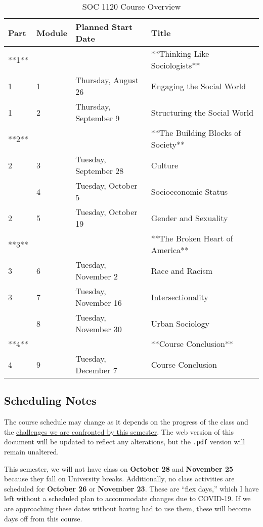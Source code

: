 \documentclass[
]{book}
\begin{document}
\begin{table}

\caption{\label{tab:unnamed-chunk-2}SOC 1120 Course Overview}
\centering
\begin{tabular}[t]{llll}
\toprule
Part & Module & Planned Start Date & Title\\
\midrule
**1** &  &  & **Thinking Like Sociologists**\\
1 & 1 & Thursday, August 26 & Engaging the Social World\\
1 & 2 & Thursday, September 9 & Structuring the Social World\\
**2** &  &  & **The Building Blocks of Society**\\
2 & 3 & Tuesday, September 28 & Culture\\
\addlinespace
2 & 4 & Tuesday, October 5 & Socioeconomic Status\\
2 & 5 & Tuesday, October 19 & Gender and Sexuality\\
**3** &  &  & **The Broken Heart of America**\\
3 & 6 & Tuesday, November 2 & Race and Racism\\
3 & 7 & Tuesday, November 16 & Intersectionality\\
\addlinespace
3 & 8 & Tuesday, November 30 & Urban Sociology\\
**4** &  &  & **Course Conclusion**\\
4 & 9 & Tuesday, December 7 & Course Conclusion\\
\bottomrule
\end{tabular}
\end{table}

\hypertarget{scheduling-notes}{%
\subsection{Scheduling Notes}\label{scheduling-notes}}

The course schedule may change as it depends on the progress of the class and the \href{covid-19.html}{challenges we are confronted by this semester}. The web version of this document will be updated to reflect any alterations, but the \texttt{.pdf} version will remain unaltered.

This semester, we will not have class on \textbf{October 28} and \textbf{November 25} because they fall on University breaks. Additionally, no class activities are scheduled for \textbf{October 26} or \textbf{November 23}. These are ``flex days,'' which I have left without a scheduled plan to accommodate changes due to COVID-19. If we are approaching these dates without having had to use them, these will become days off from this course.
\end{document}
